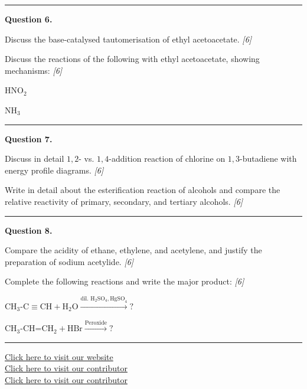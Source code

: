 \documentclass[11pt,a4paper]{article}
\newcommand{\pts}[1]{\hfill   \textit{[#1]}}
\begin{document}
\medskip\rule{\linewidth}{0.2pt}




\noindent   \textbf{Question 6.}

\begin{parts}
  \item Discuss the base-catalysed tautomerisation of ethyl acetoacetate. \pts{6}
  \item Discuss the reactions of the following with ethyl acetoacetate, showing mechanisms: \pts{6}
  
\begin{parts}
    \item $ \text{HNO}_2$
    \item $ \text{NH}_3$
  \end{parts}
\end{parts}

\medskip\rule{\linewidth}{0.2pt}




\noindent   \textbf{Question 7.}

\begin{parts}
  \item Discuss in detail $1,2$- vs. $1,4$-addition reaction of chlorine on $1,3$-butadiene with energy profile diagrams. \pts{6}
  \item Write in detail about the esterification reaction of alcohols and compare the relative reactivity of primary, secondary, and tertiary alcohols. \pts{6}
\end{parts}

\medskip\rule{\linewidth}{0.2pt}




\noindent   \textbf{Question 8.}

\begin{parts}
  \item Compare the acidity of ethane, ethylene, and acetylene, and justify the preparation of sodium acetylide. \pts{6}
  \item Complete the following reactions and write the major product: \pts{6}
  
\begin{parts}
    \item $ \text{CH}_3 \text{-C}\equiv \text{CH} +  \text{H}_2 \text{O} \xrightarrow{ \text{dil. H}_2 \text{SO}_4,  \text{HgSO}_4} ?$
    \item $ \text{CH}_3 \text{-CH=CH}_2 +  \text{HBr} \xrightarrow{ \text{Peroxide}} ?$
  \end{parts}
\end{parts}

\vfill
\rule{\linewidth}{0.4pt}

\begin{center}\small
  \href{https://bhu-exam.vercel.app/}{Click here to visit our website}\\[4pt]
  \href{https://me-aryan.vercel.app/}{Click here to visit our contributor}\\[4pt]
  \href{https://quashan-me.vercel.app/}{Click here to visit our contributor}
\end{center}
\end{document}
